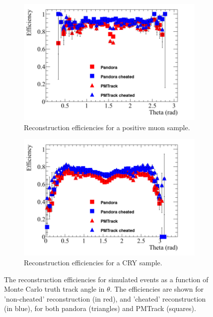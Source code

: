 \begin{figure}[h!]
  \centering
  \begin{subfigure}{0.48\textwidth}
    \centering
    \includegraphics[width=\textwidth]{Effic_AntiMuon_500V_All_Theta}
    \caption{Reconstruction efficiencies for a positive muon sample.}
    \label{fig:SimEffic_Theta_AMu}
  \end{subfigure}%
  \hspace{0.03\textwidth}%
  \begin{subfigure}{0.48\textwidth}
    \centering
    \includegraphics[width=\textwidth]{Effic_Cosmics_500V_All_Theta}
    \caption{Reconstruction efficiencies for a CRY sample.}
    \label{fig:SimEffic_Theta_CRY}
  \end{subfigure}
  \caption[The reconstruction efficiencies for simulated events as a function of Monte Carlo truth track angle in $\theta$.]
          {The reconstruction efficiencies for simulated events as a function of Monte Carlo truth track angle in $\theta$. The efficiencies are shown for 'non-cheated' reconstruction (in red), and 'cheated' reconstruction (in blue), for both pandora (triangles) and PMTrack (squares).}
          \label{fig:SimEffic_Theta}
\end{figure}

